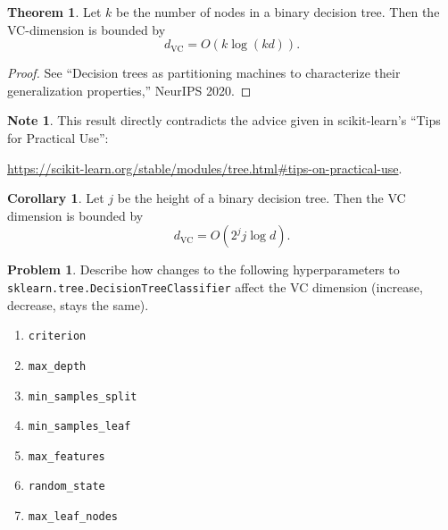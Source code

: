 \documentclass[10pt]{exam}
\theoremstyle{definition}
\newtheorem{problem}{Problem}
\newtheorem{corollary}{Corollary}
\newtheorem{note}{Note}
\newtheorem{theorem}{Theorem}
\newcommand{\Ein}{E_{\text{in}}}
\newcommand{\dvc}{{d_{\text{VC}}}}
\begin{document}
\begin{theorem}
    Let $k$ be the number of nodes in a binary decision tree.
    Then the VC-dimension is bounded by
    \begin{equation}
        \dvc = O(k\log(kd)).
    \end{equation}
\end{theorem}
\begin{proof}
    See ``Decision trees as partitioning machines to characterize their generalization properties,'' NeurIPS 2020.
\end{proof}

\begin{note}
    This result directly contradicts the advice given in scikit-learn's ``Tips for Practical Use'':
    
    \url{https://scikit-learn.org/stable/modules/tree.html#tips-on-practical-use}.
\end{note}

\begin{corollary}
    Let $j$ be the height of a binary decision tree.
    Then the VC dimension is bounded by
    \begin{equation}
        \dvc = O(2^j j \log d).
    \end{equation}
\end{corollary}


\begin{problem}
    Describe how changes to the following hyperparameters to \lstinline{sklearn.tree.DecisionTreeClassifier} affect the VC dimension (increase, decrease, stays the same).
    \begin{enumerate}
        \item \lstinline{criterion}
            \vspace{0.2in}
        \item \lstinline{max_depth}
            \vspace{0.2in}
        \item \lstinline{min_samples_split}
            \vspace{0.2in}
        \item \lstinline{min_samples_leaf}
            \vspace{0.2in}
        \item \lstinline{max_features}
            \vspace{0.2in}
        \item \lstinline{random_state}
            \vspace{0.2in}
        \item \lstinline{max_leaf_nodes}
            \vspace{0.2in}
    \end{enumerate}
\end{problem}
\end{document}
